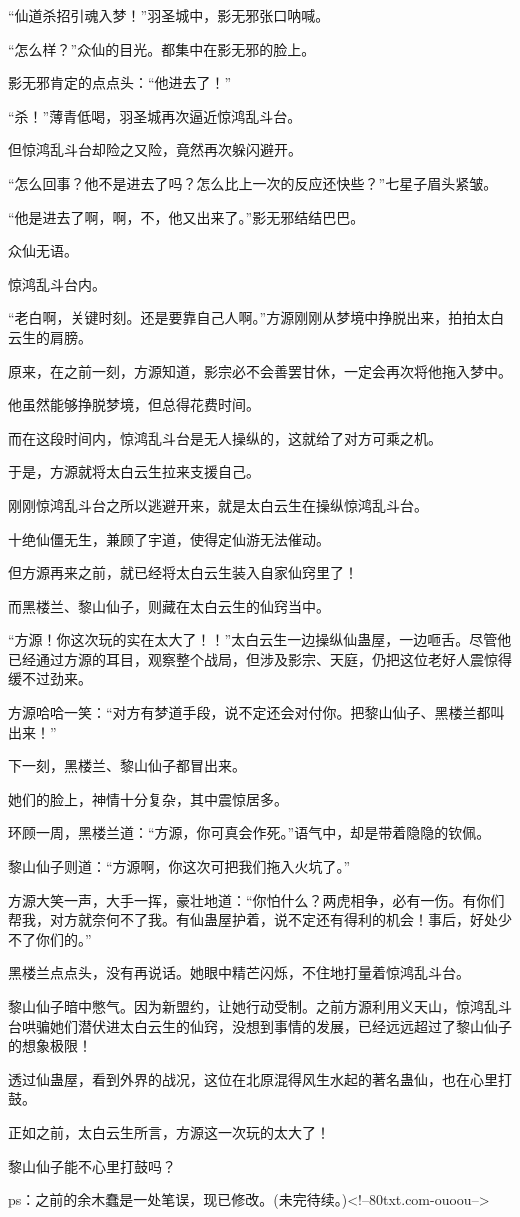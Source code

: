 \begin{this_body}
“仙道杀招引魂入梦！”羽圣城中，影无邪张口呐喊。

“怎么样？”众仙的目光。都集中在影无邪的脸上。

影无邪肯定的点点头：“他进去了！”

“杀！”薄青低喝，羽圣城再次逼近惊鸿乱斗台。

但惊鸿乱斗台却险之又险，竟然再次躲闪避开。

“怎么回事？他不是进去了吗？怎么比上一次的反应还快些？”七星子眉头紧皱。

“他是进去了啊，啊，不，他又出来了。”影无邪结结巴巴。

众仙无语。

惊鸿乱斗台内。

“老白啊，关键时刻。还是要靠自己人啊。”方源刚刚从梦境中挣脱出来，拍拍太白云生的肩膀。

原来，在之前一刻，方源知道，影宗必不会善罢甘休，一定会再次将他拖入梦中。

他虽然能够挣脱梦境，但总得花费时间。

而在这段时间内，惊鸿乱斗台是无人操纵的，这就给了对方可乘之机。

于是，方源就将太白云生拉来支援自己。

刚刚惊鸿乱斗台之所以逃避开来，就是太白云生在操纵惊鸿乱斗台。

十绝仙僵无生，兼顾了宇道，使得定仙游无法催动。

但方源再来之前，就已经将太白云生装入自家仙窍里了！

而黑楼兰、黎山仙子，则藏在太白云生的仙窍当中。

“方源！你这次玩的实在太大了！！”太白云生一边操纵仙蛊屋，一边咂舌。尽管他已经通过方源的耳目，观察整个战局，但涉及影宗、天庭，仍把这位老好人震惊得缓不过劲来。

方源哈哈一笑：“对方有梦道手段，说不定还会对付你。把黎山仙子、黑楼兰都叫出来！”

下一刻，黑楼兰、黎山仙子都冒出来。

她们的脸上，神情十分复杂，其中震惊居多。

环顾一周，黑楼兰道：“方源，你可真会作死。”语气中，却是带着隐隐的钦佩。

黎山仙子则道：“方源啊，你这次可把我们拖入火坑了。”

方源大笑一声，大手一挥，豪壮地道：“你怕什么？两虎相争，必有一伤。有你们帮我，对方就奈何不了我。有仙蛊屋护着，说不定还有得利的机会！事后，好处少不了你们的。”

黑楼兰点点头，没有再说话。她眼中精芒闪烁，不住地打量着惊鸿乱斗台。

黎山仙子暗中憋气。因为新盟约，让她行动受制。之前方源利用义天山，惊鸿乱斗台哄骗她们潜伏进太白云生的仙窍，没想到事情的发展，已经远远超过了黎山仙子的想象极限！

透过仙蛊屋，看到外界的战况，这位在北原混得风生水起的著名蛊仙，也在心里打鼓。

正如之前，太白云生所言，方源这一次玩的太大了！

黎山仙子能不心里打鼓吗？

ps：之前的余木蠢是一处笔误，现已修改。(未完待续。)<!--80txt.com-ouoou-->

\end{this_body}

